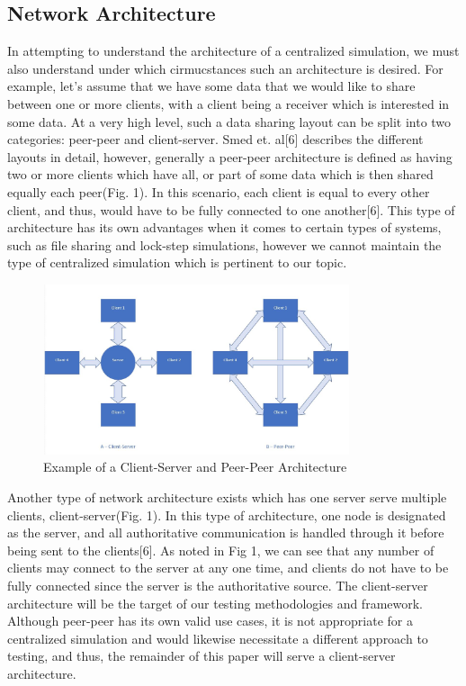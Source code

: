 \documentclass[conference]{IEEEtran}
\begin{document}
\subsection{Network Architecture}

In attempting to understand the architecture of a centralized simulation, we must also understand under which cirmucstances such an architecture is desired. For example,
let's assume that we have some data that we would like to share between one or more clients, with a client being a receiver which is interested in some data. At a very high level, such
a data sharing layout can be split into two categories: peer-peer and client-server. Smed et. al[6] describes the different layouts in detail, however, generally a peer-peer architecture 
is defined as having two or more clients which have all, or part of some data which is then shared equally each peer(Fig. 1). In this scenario, each client is equal to every other client, and thus,
would have to be fully connected to one another[6]. This type of architecture has its own advantages when it comes to certain types of systems, such as file sharing and lock-step simulations,
however we cannot maintain the type of centralized simulation which is pertinent to our topic. 

\begin{figure}[htbp]
\centerline{\includegraphics [width = 9cm, height = 5cm] {NetworkArchitecture.jpg}}
\caption{Example of a Client-Server and Peer-Peer Architecture}
\end{figure}

Another type of network architecture exists which has one server serve multiple clients, client-server(Fig. 1). In this type of architecture, one node is designated as the server,
and all authoritative communication is handled through it before being sent to the clients[6]. As noted in Fig 1, we can see that any number of clients may connect to the server
at any one time, and clients do not have to be fully connected since the server is the authoritative source. The client-server architecture will be the target of our testing methodologies
and framework. Although peer-peer has its own valid use cases, it is not appropriate for a centralized simulation and would likewise necessitate a different approach to testing, and thus,
the remainder of this paper will serve a client-server architecture.
\end{document}

